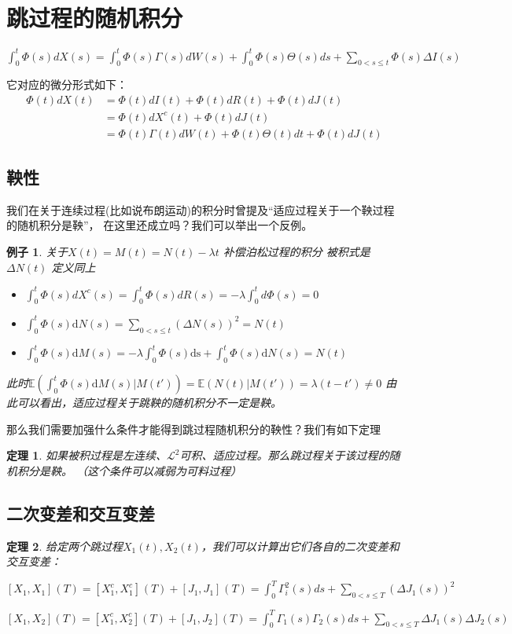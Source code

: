 \documentclass[a4paper, 12pt]{ctexart}
\newtheorem*{theorem}{定理}
\newtheorem*{example}{例子}
\begin{document}
\section{跳过程的随机积分}
$\int_0^t \Phi(s)dX(s) = \int_0^t \Phi(s)\Gamma(s)dW(s) + \int_0^t \Phi(s)\Theta(s)ds+ \underset{ 0<s\leq t }{ \sum }\Phi(s)\Delta I(s)$

它对应的微分形式如下：
\begin{align*} \Phi(t)dX(t) &= \Phi(t)dI(t) + \Phi(t)dR(t) + \Phi(t)dJ(t)\\ &= \Phi(t)dX^c(t)+ \Phi(t)dJ(t)\\
    &=\Phi(t)\Gamma(t)dW(t) + \Phi(t)\Theta(t)dt+ \Phi(t)dJ(t)
\end{align*}

    

\subsection{鞅性}
我们在关于连续过程(比如说布朗运动)的积分时曾提及“适应过程关于一个鞅过程的随机积分是鞅”，
在这里还成立吗？我们可以举出一个反例。

\begin{example}
关于$X(t)=M(t)=N(t)-\lambda t$ 补偿泊松过程的积分  被积式是$\Delta N(t)$ 定义同上
\begin{itemize}
    \item $\int_0^t\Phi(s)dX^c(s)=\int_0^t\Phi(s)dR(s)=-{\lambda}\int_0^td\Phi(s)=0$
    \item $\int_0^t\Phi(s)\mathrm{d}N(s)=\sum_{0<s\leqslant t}(\Delta N(s))^2=N(t)$
    \item $\int_0^t\Phi(s)\mathrm{d}M(s)=-\lambda\int_0^t\Phi(s)\mathrm{ds}+\int_0^t\Phi(s)\mathrm{d}N(s)=N(t)$
\end{itemize}

此时$\mathbb{E}(\int_0^t\Phi(s)\mathrm{d}M(s)|M(t'))=\mathbb{E}(N(t)|M(t'))=\lambda(t-t')\neq 0$ 由此可以看出，适应过程关于跳鞅的随机积分不一定是鞅。
\end{example}

那么我们需要加强什么条件才能得到跳过程随机积分的鞅性？我们有如下定理

\begin{theorem}
    如果被积过程是左连续、$\mathscr{L}^2$可积、适应过程。那么跳过程关于该过程的随机积分是鞅。
    （这个条件可以减弱为可料过程）
\end{theorem}

\subsection{二次变差和交互变差}
\begin{theorem}
    给定两个跳过程$X_1 (t),X_2 (t)$，我们可以计算出它们各自的二次变差和交互变差：

$[X_{1},X_{1}]^{}(T)=[X_{1}^{c},X_{1}^{c}]^{}(T)+[J_{1},J_{1}]^{}(T)=\int_{0}^{T}\Gamma_{i}^{2}(s)ds+\underset{{0<s\leq T}}{\sum}(\Delta J_{1}(s))^{2}$

$[X_1, X_2](T) = [X_1^c, X_2^c](T) + [J_1, J_2](T)= \int_0^T \Gamma_1(s)\Gamma_2(s)ds + \underset{{0<s\leq T}}{\sum}\Delta J_1(s)\Delta J_2(s)$

\end{theorem}
\end{document}
